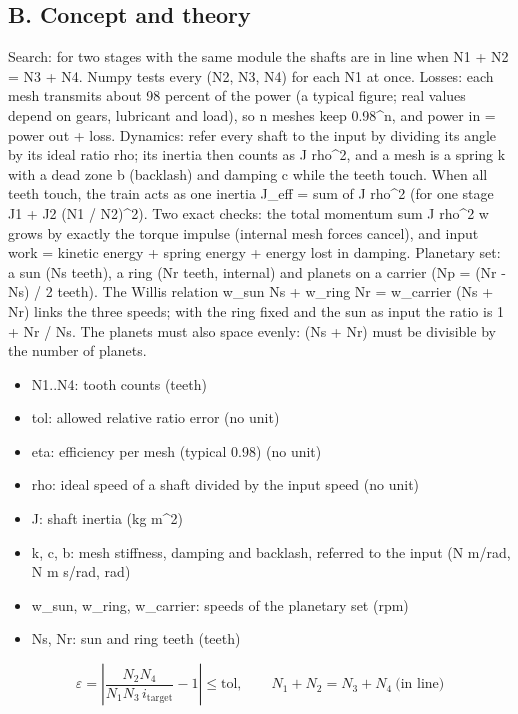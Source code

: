 \documentclass[11pt,a4paper]{article}
\begin{document}
\subsection*{B. Concept and theory}
Search: for two stages with the same module the shafts are in line when N1 + N2 = N3 + N4. Numpy tests every (N2, N3, N4) for each N1 at once. Losses: each mesh transmits about 98 percent of the power (a typical figure; real values depend on gears, lubricant and load), so n meshes keep 0.98\textasciicircum{}n, and power in = power out + loss. Dynamics: refer every shaft to the input by dividing its angle by its ideal ratio rho; its inertia then counts as J rho\textasciicircum{}2, and a mesh is a spring k with a dead zone b (backlash) and damping c while the teeth touch. When all teeth touch, the train acts as one inertia J\_eff = sum of J rho\textasciicircum{}2 (for one stage J1 + J2 (N1 / N2)\textasciicircum{}2). Two exact checks: the total momentum sum J rho\textasciicircum{}2 w grows by exactly the torque impulse (internal mesh forces cancel), and input work = kinetic energy + spring energy + energy lost in damping. Planetary set: a sun (Ns teeth), a ring (Nr teeth, internal) and planets on a carrier (Np = (Nr - Ns) / 2 teeth). The Willis relation w\_sun Ns + w\_ring Nr = w\_carrier (Ns + Nr) links the three speeds; with the ring fixed and the sun as input the ratio is 1 + Nr / Ns. The planets must also space evenly: (Ns + Nr) must be divisible by the number of planets.

\begin{itemize}[nosep]
\item N1..N4: tooth counts (teeth)
\item tol: allowed relative ratio error (no unit)
\item eta: efficiency per mesh (typical 0.98) (no unit)
\item rho: ideal speed of a shaft divided by the input speed (no unit)
\item J: shaft inertia (kg m\textasciicircum{}2)
\item k, c, b: mesh stiffness, damping and backlash, referred to the input (N m/rad, N m s/rad, rad)
\item w\_sun, w\_ring, w\_carrier: speeds of the planetary set (rpm)
\item Ns, Nr: sun and ring teeth (teeth)
\end{itemize}

\begin{equation*}
\varepsilon=\left|\frac{N_2N_4}{N_1N_3\,i_\mathrm{target}}-1\right|\le \mathrm{tol},\qquad N_1+N_2=N_3+N_4\ \text{(in line)}
\end{equation*}
\end{document}
